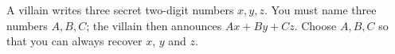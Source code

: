 A villain writes three secret two-digit numbers $x,y,z$. You must name three numbers $A,B,C$; the villain then announces $Ax+By+Cz$. Choose $A,B,C$ so that you can always recover $x$, $y$ and $z$.
